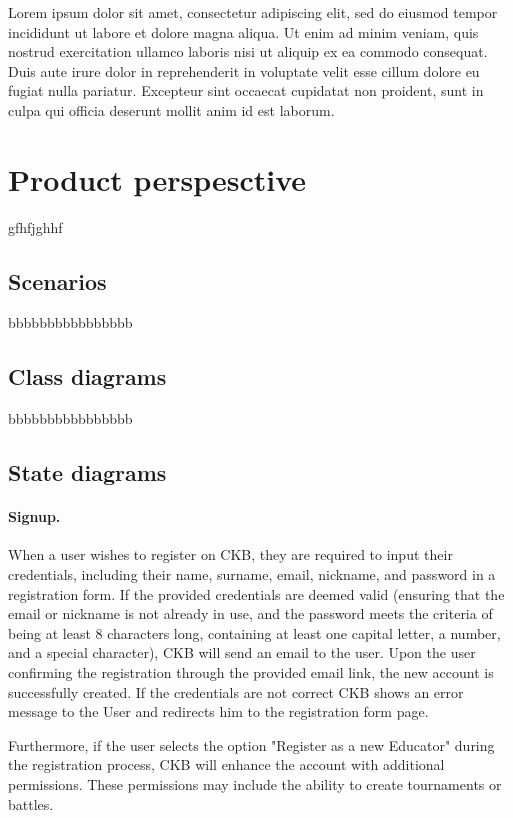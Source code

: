 Lorem ipsum dolor sit amet, consectetur adipiscing elit, sed do eiusmod tempor incididunt ut labore et dolore magna aliqua. Ut enim ad minim veniam, quis nostrud exercitation ullamco laboris nisi ut aliquip ex ea commodo consequat. Duis aute irure dolor in reprehenderit in voluptate velit esse cillum dolore eu fugiat nulla pariatur. Excepteur sint occaecat cupidatat non proident, sunt in culpa qui officia deserunt mollit anim id est laborum.

\newpage

\section{Product perspesctive}
\label{sec:product_perspesctive}%
gfhfjghhf

\subsection{Scenarios}
\label{subsec:scenarios}%
bbbbbbbbbbbbbbbb

\subsection{Class diagrams}
\label{subsec:class_diagrams}%
bbbbbbbbbbbbbbbb

\subsection{State diagrams}
\label{subsec:state_diagrams}%
\paragraph{Signup.}
When a user wishes to register on CKB, they are required to input their credentials, including their name, surname, email, nickname, and password in a registration form. If the provided credentials are deemed valid (ensuring that the email or nickname is not already in use, and the password meets the criteria of being at least 8 characters long, containing at least one capital letter, a number, and a special character), CKB will send an email to the user. Upon the user confirming the registration through the provided email link, the new account is successfully created. If the credentials are not correct CKB shows an error message to the User and redirects him to the registration form page.

Furthermore, if the user selects the option "Register as a new Educator" during the registration process, CKB will enhance the account with additional permissions. These permissions may include the ability to create tournaments or battles.

